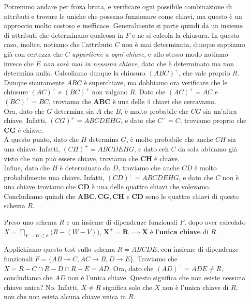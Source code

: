 \documentclass[11pt, a4paper, titlepage, oneside]{scrbook}
\begin{document}
Potremmo andare per froza bruta, e verificare ogni possibile combinazione di attributi e trovare le uniche che possano funzionare come chiavi, ma questo è un approccio molto costoso e inefficace. Generalmente si parte quindi da un insieme di attributi che determinano qualcosa in $F$ e ne si calcola la  chiusura. In questo caso, inoltre, notiamo che l'attributo $C$ non è mai determinata, dunque sappiamo già con certezza che $C$ \textit{appartiene a ogni chiave}, e allo stesso modo notiamo invece che $E$ \textit{non sarà mai in nessuna chiave}, dato che è determinato ma non determina nulla. Calcoliamo dunque la chiusura $(ABC)^+$, che vale proprio $R$. Dunque sicuramente $ABC$ è superchiave, ma dobbiamo ora verificare che le chiusure $(AC)^+$ e $(BC)^+$ non valgano $R$. Dato che $(AC)^+ = AC$ e $(BC)^+ = BC$, troviamo che $\bm{ABC}$ è una delle 4 chiavi che cercavamo. \\
Ora, dato che $G$ determina sia $A$ che $B$, è molto probabile che $CG$ sia un'altra chiave. Infatti, $(CG)^+ = ABCDEHG$, e dato che $C^+ = C$, troviamo proprio che $\bm{CG}$ è chiave. \\
A questo punto, dato che $H$ determina $G$, è molto probabile che anche $CH$ sia una chiave. Infatti, $(CH)^+ = ABCDEHG$, e dato ceh $C$ da sola abbiamo già visto che non può essere chiave, troviamo che $\bm{CH}$ è chiave. \\
Infine, dato che $H$ è determinato da $D$, troviamo che anche $CD$ è molto probabilmente una chiave. Infatti, $(CD)^+ = ABCDEHG$, e dato che $C$ non è una chiave troviamo che $\bm{CD}$ è una delle quattro chiavi che volevamo. \\
Concludiamo quindi che $\bm{ABC, CG, CH}$ e $\bm{CD}$ sono le quattro chiavi di questo schema $R$.

\begin{Proposizione}
\label{propos-test-unicità}
Preso uno schema $R$ e un insieme di dipendenze funzionali $F$, dopo aver calcolato
{\boldmath$X = \bm{\bigcap}_{V \to W \in F} \bigl(R - (W - V)\bigr)$},
$\bm{X^+ = R} \implies \bm{X}$ è l'\textbf{unica chiave} di $R$.
\end{Proposizione}

Applichiamo questo test sullo schema $R = ABCDE$, con insieme di dipendenze funzionali $F = \{AB \longrightarrow C, AC \longrightarrow B, D \longrightarrow E\}$. Troviamo che $X = R - C \cap R - D \cap  R - E = AD$. Ora, dato che $(AD)^+ = ADE \neq R$, concludiamo che $AD$ non è l'unica chiave. Questo significa che non esiste nessuna chiave unica? No. Infatti, $X \neq R$ significa solo che $X$ non è l'unica chiave di $R$, non che non esista alcuna chiave unica in $R$.
\end{document}
